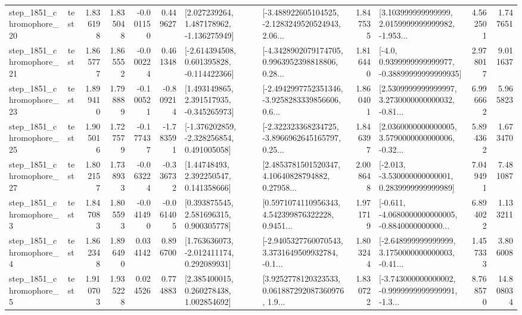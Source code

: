 \begin{tabular}{llrrrrllrlrr}
 step\_1851\_chromophore\_20 &      test &      1.836198 &    1.835048 &     -0.001150 &  0.449627 &    [2.027239264, 1.487178962, -1.136275949] &  [-3.488922605104525, -2.1283249520524943, 2.06... &       1.847535 &  [3.103999999999999, 2.0159999999999982, -1.953... &            4.562501 &          1.747651 \\
 step\_1851\_chromophore\_21 &      test &      1.865777 &    1.865552 &     -0.000224 &  0.461348 &   [-2.614394508, 0.601395828, -0.114422366] &  [-4.3428902079174705, 0.9963952398818806, 0.28... &       1.816440 &   [-4.0, 0.9399999999999977, -0.38899999999999935] &            2.978017 &          9.011637 \\
 step\_1851\_chromophore\_23 &      test &      1.899410 &    1.798889 &     -0.100521 & -0.809214 &    [1.493149865, 2.391517935, -0.345265973] &  [-2.4942997752351346, -3.9258283339856606, 0.6... &       1.860401 &  [2.5309999999999997, 3.2730000000000032, -0.81... &            6.996662 &          5.965823 \\
 step\_1851\_chromophore\_25 &      test &      1.905016 &    1.727579 &     -0.177437 & -1.783591 &   [-1.376202859, -2.328256854, 0.491005058] &  [-2.322323368234725, -3.8966962645165797, 0.25... &       1.846397 &  [2.0360000000000005, 3.5790000000000006, -0.32... &            5.894362 &          1.673470 \\
 step\_1851\_chromophore\_27 &      test &      1.802157 &    1.738933 &     -0.063224 & -0.336732 &      [1.44748493, 2.392250547, 0.141358666] &  [2.4853781501520347, 4.10640828794882, 0.27958... &       2.008648 &   [-2.013, -3.530000000000001, 0.2839999999999989] &            7.049491 &          7.481087 \\
  step\_1851\_chromophore\_3 &      test &      1.847083 &    1.805593 &     -0.041490 & -0.061405 &     [0.393875545, 2.581696315, 0.900305778] &  [0.5971074110956343, 4.542399876322228, 0.9451... &       1.971719 &  [-0.611, -4.0680000000000005, -0.8840000000000... &            6.894022 &          1.133211 \\
  step\_1851\_chromophore\_4 &      test &      1.862348 &    1.896490 &      0.034142 &  0.896700 &    [1.763636073, -2.012411174, 0.292089931] &  [-2.9405327760070543, 3.3731649509932784, -0.1... &       1.803244 &  [-2.648999999999999, 3.1750000000000003, -0.41... &            1.457333 &          3.806008 \\
  step\_1851\_chromophore\_5 &      test &      1.910703 &    1.935228 &      0.024526 &  0.774883 &     [2.385400015, 0.260278438, 1.002854692] &  [3.9252778120323533, 0.061887292087360976, 1.9... &       1.830722 &  [-3.743000000000002, -0.9999999999999991, -1.3... &            8.768570 &         14.808034 \\

\end{tabular}
